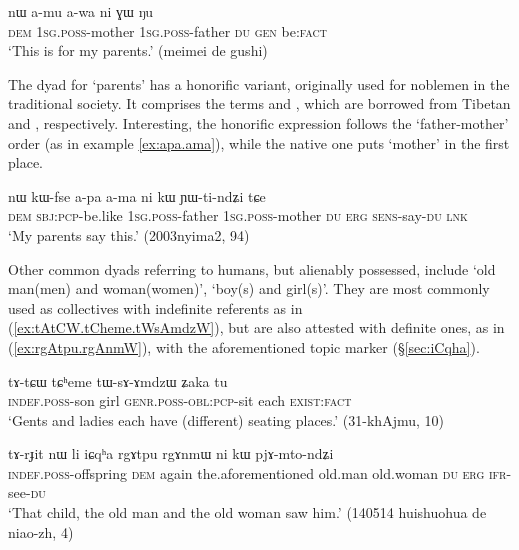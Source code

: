 \begin{exe}
\ex \label{ex:amu.awa.ni.GW}
 \gll nɯ a-mu a-wa ni ɣɯ ŋu \\
 \textsc{dem}  \textsc{1sg}.\textsc{poss}-mother \textsc{1sg}.\textsc{poss}-father \textsc{du} \textsc{gen} be:\textsc{fact} \\
 \glt `This is for my parents.' (meimei de gushi)
\end{exe}

The dyad for `parents' has a honorific variant, originally used for noblemen in the traditional society. It comprises the terms  and , which are borrowed from Tibetan   and , respectively. Interesting, the honorific expression follows the `father-mother' order (as in example \ref{ex:apa.ama}), while the native one puts `mother' in the first place.

\begin{exe}
\ex \label{ex:apa.ama}
 \gll nɯ kɯ-fse a-pa a-ma ni kɯ ɲɯ-ti-ndʑi tɕe \\
 \textsc{dem} \textsc{sbj}:\textsc{pcp}-be.like \textsc{1sg}.\textsc{poss}-father  \textsc{1sg}.\textsc{poss}-mother \textsc{du} \textsc{erg} \textsc{sens}-say-\textsc{du} \textsc{lnk} \\
 \glt `My parents say this.' (2003nyima2, 94)
\end{exe}

Other common dyads referring to humans, but alienably possessed, include  `old man(men) and woman(women)',  `boy(s) and girl(s)'. They are most commonly used as collectives with indefinite referents as in (\ref{ex:tAtCW.tCheme.tWsAmdzW}), but are also attested with definite ones, as in (\ref{ex:rgAtpu.rgAnmW}), with the aforementioned topic marker  (§\ref{sec:iCqha}).
 
\begin{exe}
\ex \label{ex:tAtCW.tCheme.tWsAmdzW}
 \gll  tɤ-tɕɯ tɕʰeme tɯ-sɤ-ɤmdzɯ ʑaka tu \\
 \textsc{indef}.\textsc{poss}-son girl \textsc{genr}.\textsc{poss}-\textsc{obl}:\textsc{pcp}-sit each \textsc{exist}:\textsc{fact} \\
\glt `Gents and ladies each have (different) seating places.' (31-khAjmu, 10)
\end{exe}

\begin{exe}
\ex \label{ex:rgAtpu.rgAnmW}
 \gll tɤ-rɟit nɯ li iɕqʰa rgɤtpu rgɤnmɯ ni kɯ pjɤ-mto-ndʑi \\
 \textsc{indef}.\textsc{poss}-offspring \textsc{dem} again the.aforementioned  old.man old.woman \textsc{du} \textsc{erg} \textsc{ifr}-see-\textsc{du} \\
\glt `That child, the old man and the old woman saw him.' (140514 huishuohua de niao-zh, 4)
\end{exe}

